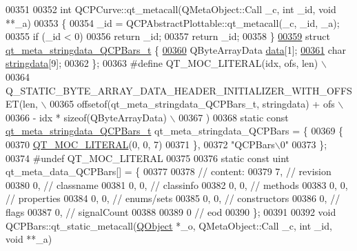 \begin{DoxyCode}
00351 
00352 \textcolor{keywordtype}{int} QCPCurve::qt\_metacall(QMetaObject::Call \_c, \textcolor{keywordtype}{int} \_id, \textcolor{keywordtype}{void} **\_a)
00353 \{
00354     \_id = QCPAbstractPlottable::qt\_metacall(\_c, \_id, \_a);
00355     \textcolor{keywordflow}{if} (\_id < 0)
00356         \textcolor{keywordflow}{return} \_id;
00357     \textcolor{keywordflow}{return} \_id;
00358 \}
\hypertarget{a00067_source_l00359}{}\hyperlink{a00067}{00359} \textcolor{keyword}{struct }\hyperlink{a00067_dc/d57/a00194}{qt\_meta\_stringdata\_QCPBars\_t} \{
\hypertarget{a00067_source_l00360}{}\hyperlink{a00067_a5237dfd2ea3d5be916ce7c562d734ff4}{00360}     QByteArrayData \hyperlink{a00067_a5237dfd2ea3d5be916ce7c562d734ff4}{data}[1];
\hypertarget{a00067_source_l00361}{}\hyperlink{a00067_a07ece80e538a4239e2a3b6d4b9782407}{00361}     \textcolor{keywordtype}{char} \hyperlink{a00067_a07ece80e538a4239e2a3b6d4b9782407}{stringdata}[9];
00362 \};
00363 \textcolor{preprocessor}{#define QT\_MOC\_LITERAL(idx, ofs, len) \(\backslash\)}
00364 \textcolor{preprocessor}{    Q\_STATIC\_BYTE\_ARRAY\_DATA\_HEADER\_INITIALIZER\_WITH\_OFFSET(len, \(\backslash\)}
00365 \textcolor{preprocessor}{    offsetof(qt\_meta\_stringdata\_QCPBars\_t, stringdata) + ofs \(\backslash\)}
00366 \textcolor{preprocessor}{        - idx * sizeof(QByteArrayData) \(\backslash\)}
00367 \textcolor{preprocessor}{    )}
00368 \textcolor{keyword}{static} \textcolor{keyword}{const} \hyperlink{a00067_dc/d57/a00194}{qt\_meta\_stringdata\_QCPBars\_t} qt\_meta\_stringdata\_QCPBars = \{
00369     \{
00370 \hyperlink{a00067_a75bb9482d242cde0a06c9dbdc6b83abe}{QT\_MOC\_LITERAL}(0, 0, 7)
00371     \},
00372     \textcolor{stringliteral}{"QCPBars\(\backslash\)0"}
00373 \};
00374 \textcolor{preprocessor}{#undef QT\_MOC\_LITERAL}
00375 
00376 \textcolor{keyword}{static} \textcolor{keyword}{const} uint qt\_meta\_data\_QCPBars[] = \{
00377 
00378  \textcolor{comment}{// content:}
00379        7,       \textcolor{comment}{// revision}
00380        0,       \textcolor{comment}{// classname}
00381        0,    0, \textcolor{comment}{// classinfo}
00382        0,    0, \textcolor{comment}{// methods}
00383        0,    0, \textcolor{comment}{// properties}
00384        0,    0, \textcolor{comment}{// enums/sets}
00385        0,    0, \textcolor{comment}{// constructors}
00386        0,       \textcolor{comment}{// flags}
00387        0,       \textcolor{comment}{// signalCount}
00388 
00389        0        \textcolor{comment}{// eod}
00390 \};
00391 
00392 \textcolor{keywordtype}{void} QCPBars::qt\_static\_metacall(\hyperlink{a00059}{QObject} *\_o, QMetaObject::Call \_c, \textcolor{keywordtype}{int} \_id, \textcolor{keywordtype}{void} **\_a)

\end{DoxyCode}
